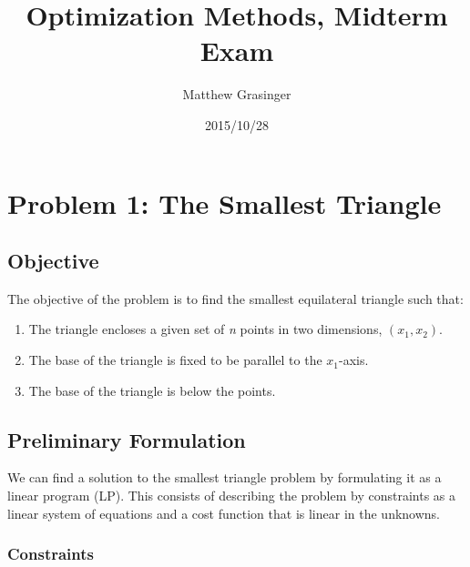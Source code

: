 \documentclass{article}
\title{Optimization Methods, Midterm Exam}
\date{2015/10/28}
\author{Matthew Grasinger}
\begin{document}
	
	
\maketitle
\newpage
\tableofcontents
\newpage
{}

\section{Problem 1: The Smallest Triangle} \label{sec:small_triangle}

\subsection{Objective}

The objective of the problem is to find the smallest equilateral triangle such that: 
\begin{enumerate}
	\item \label{enum:enclose} The triangle encloses a given set of \textit{n} points in two dimensions, $(x_1, x_2)$.
	\item \label{enum:base_parallel} The base of the triangle is fixed to be parallel to the $x_1$-axis.
	\item \label{enum:base_below} The base of the triangle is below the points.
\end{enumerate}

\subsection{Preliminary Formulation}

We can find a solution to the smallest triangle problem by formulating it as a linear program (LP).
This consists of describing the problem by constraints as a linear system of equations and a cost function that is linear in the unknowns.

\subsubsection{Constraints}
\end{document}
